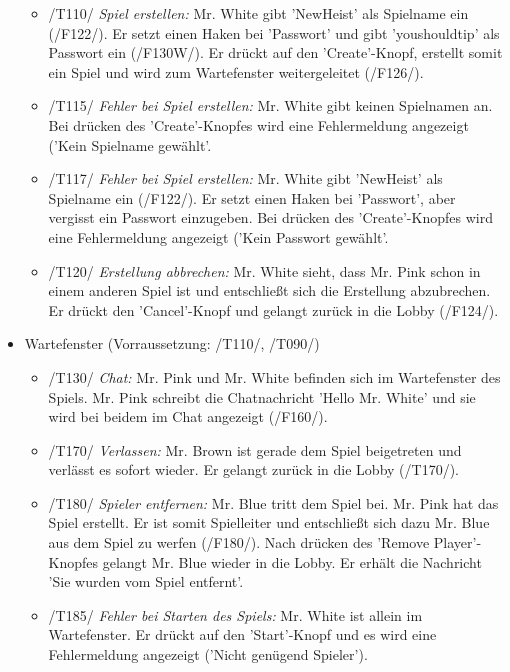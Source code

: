 \documentclass{article}
\begin{document}
\begin{itemize}
\begin{itemize}
		\item /T110/ \textit{Spiel erstellen:} Mr. White gibt 'NewHeist' als Spielname ein (/F122/). Er setzt einen Haken bei 'Passwort' und gibt 'youshouldtip' als Passwort ein (/F130W/). Er drückt auf den 'Create'-Knopf, erstellt somit ein Spiel und wird zum Wartefenster weitergeleitet (/F126/).
		
		\item /T115/ \textit{Fehler bei Spiel erstellen:} Mr. White gibt keinen Spielnamen an. Bei drücken des 'Create'-Knopfes wird eine Fehlermeldung angezeigt ('Kein Spielname gewählt'.
		
		\item /T117/ \textit{Fehler bei Spiel erstellen:} Mr. White gibt 'NewHeist' als Spielname ein (/F122/). Er setzt einen Haken bei 'Passwort', aber vergisst ein Passwort einzugeben. Bei drücken des 'Create'-Knopfes wird eine Fehlermeldung angezeigt ('Kein Passwort gewählt'.
		
		\item /T120/ \textit{Erstellung abbrechen:} Mr. White sieht, dass Mr. Pink schon in einem anderen Spiel ist und entschließt sich die Erstellung abzubrechen. Er drückt den 'Cancel'-Knopf und gelangt zurück in die Lobby (/F124/).
	
	\end{itemize}
	
	\item Wartefenster (Vorraussetzung: /T110/, /T090/)
	
	\begin{itemize}
		
		\item /T130/ \textit{Chat:} Mr. Pink und Mr. White befinden sich im Wartefenster des Spiels. Mr. Pink schreibt die Chatnachricht 'Hello Mr. White' und sie wird bei beidem im Chat angezeigt (/F160/).
		
		\item /T170/ \textit{Verlassen:} Mr. Brown ist gerade dem Spiel beigetreten und verlässt es sofort wieder. Er gelangt zurück in die Lobby (/T170/).
		
		\item /T180/ \textit{Spieler entfernen:} Mr. Blue tritt dem Spiel bei. Mr. Pink hat das Spiel erstellt. Er ist somit Spielleiter und entschließt sich dazu Mr. Blue aus dem Spiel zu werfen (/F180/). Nach drücken des 'Remove Player'-Knopfes gelangt Mr. Blue wieder in die Lobby. Er erhält die Nachricht 'Sie wurden vom Spiel entfernt'.
		
		\item /T185/ \textit{Fehler bei Starten des Spiels:} Mr. White ist allein im Wartefenster. Er drückt auf den 'Start'-Knopf und es wird eine Fehlermeldung angezeigt ('Nicht genügend Spieler').
		

\end{itemize}
\end{itemize}
\end{document}
